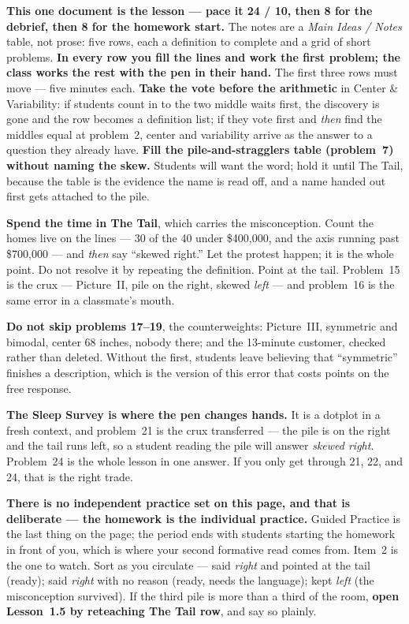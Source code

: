 \documentclass[10pt]{article}
\begin{document}
\begin{teachernote}
\textbf{This one document is the lesson --- pace it 24 / 10, then 8 for the debrief, then 8 for
the homework start.} The notes are a \emph{Main Ideas / Notes} table, not prose: five rows, each
a definition to complete and a grid of short problems. \textbf{In every row you fill the lines
and work the first problem; the class works the rest with the pen in their hand.} The first
three rows must move --- five minutes each. \textbf{Take the vote before the arithmetic} in
Center \& Variability: if students count in to the two middle waits first, the discovery is gone
and the row becomes a definition list; if they vote first and \emph{then} find the middles equal
at problem~2, center and variability arrive as the answer to a question they already have.
\textbf{Fill the pile-and-stragglers table (problem~7) without naming the skew.} Students will
want the word; hold it until The Tail, because the table is the evidence the name is read off,
and a name handed out first gets attached to the pile.

\textbf{Spend the time in The Tail}, which carries the misconception. Count the homes live on
the lines --- 30 of the 40 under \$400{,}000, and the axis running past \$700{,}000 --- and
\emph{then} say ``skewed right.'' Let the protest happen; it is the whole point. Do not resolve
it by repeating the definition. Point at the tail. Problem~15 is the crux --- Picture~II, pile
on the right, skewed \emph{left} --- and problem~16 is the same error in a classmate's mouth.

\textbf{Do not skip problems 17--19}, the counterweights: Picture~III, symmetric and bimodal,
center 68 inches, nobody there; and the 13-minute customer, checked rather than deleted.
Without the first, students leave believing that ``symmetric'' finishes a description, which is
the version of this error that costs points on the free response.

\textbf{The Sleep Survey is where the pen changes hands.} It is a dotplot in a fresh context,
and problem~21 is the crux transferred --- the pile is on the right and the tail runs left, so
a student reading the pile will answer \emph{skewed right}. Problem~24 is the whole lesson in
one answer. If you only get through 21, 22, and 24, that is the right trade.

\textbf{There is no independent practice set on this page, and that is deliberate --- the
homework is the individual practice.} Guided Practice is the last thing on the page; the period
ends with students starting the homework in front of you, which is where your second formative
read comes from. Item~2 is the one to watch. Sort as you circulate --- said \emph{right} and
pointed at the tail (ready); said \emph{right} with no reason (ready, needs the language); kept
\emph{left} (the misconception survived). If the third pile is more than a third of the room,
\textbf{open Lesson~1.5 by reteaching The Tail row}, and say so plainly.


\end{teachernote}
\end{document}
